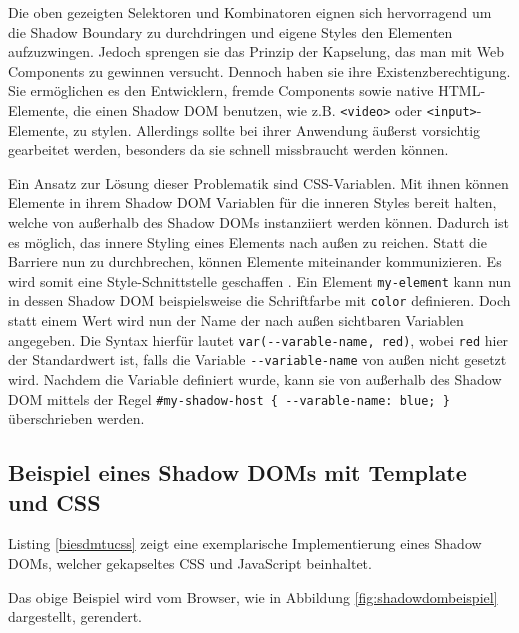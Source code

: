 Die oben gezeigten Selektoren und Kombinatoren eignen sich hervorragend um die Shadow Boundary zu durchdringen und eigene Styles den Elementen aufzuzwingen. Jedoch sprengen sie das Prinzip der Kapselung, das man mit Web Components zu gewinnen versucht. Dennoch haben sie ihre Existenzberechtigung. Sie ermöglichen es den Entwicklern, fremde Components sowie native \ac{HTML}-Elemente, die einen Shadow \ac{DOM} benutzen, wie z.B. \texttt{\textless{}video\textgreater{}} oder \texttt{\textless{}input\textgreater{}}-Elemente, zu stylen. Allerdings sollte bei ihrer Anwendung äußerst vorsichtig gearbeitet werden, besonders da sie schnell missbraucht werden können.

Ein Ansatz zur Lösung dieser Problematik sind \ac{CSS}-Variablen. Mit ihnen können Elemente in ihrem Shadow \ac{DOM} Variablen für die inneren Styles bereit halten, welche von außerhalb des Shadow \ac{DOM}s instanziiert werden können. Dadurch ist es möglich, das innere Styling eines Elements nach außen zu reichen. Statt die Barriere nun zu durchbrechen, können Elemente miteinander kommunizieren. Es wird somit eine Style-Schnittstelle geschaffen \cite{citeulike:13883381}. Ein Element \texttt{my-element} kann nun in dessen Shadow \ac{DOM} beispielsweise die Schriftfarbe mit \texttt{color} definieren. Doch statt einem Wert wird nun der Name der nach außen sichtbaren Variablen angegeben. Die Syntax hierfür lautet \texttt{var(-\/-varable-name,\ red)}, wobei \texttt{red} hier der Standardwert ist, falls die Variable \texttt{-\/-variable-name} von außen nicht gesetzt wird. Nachdem die Variable definiert wurde, kann sie von außerhalb des Shadow \ac{DOM} mittels der Regel \texttt{\#my-shadow-host\ \{\ -\/-varable-name:\ blue;\ \}} überschrieben werden.


\newpage
\subsection{Beispiel eines Shadow DOMs mit Template und CSS}\label{beispiel-eines-shadow-doms-mit-template-und-css}

Listing \ref{biesdmtucss} zeigt eine exemplarische Implementierung eines Shadow \ac{DOM}s, welcher gekapseltes \ac{CSS} und JavaScript beinhaltet.



Das obige Beispiel wird vom Browser, wie in Abbildung \ref{fig:shadowdombeispiel} dargestellt, gerendert.

